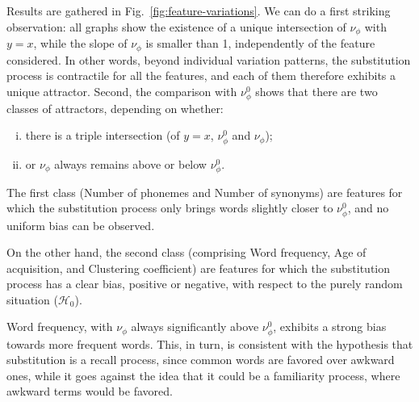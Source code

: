 \medskip
Results are gathered in Fig.~\ref{fig:feature-variations}.
We can do a first striking observation: all graphs show the existence of a unique intersection of $\nu_{\phi}$ with $y=x$, while the slope of $\nu_{\phi}$ is smaller than 1, independently of the feature considered.
In other words, beyond individual variation patterns, the substitution process is contractile for all the features, and each of them therefore exhibits a unique attractor.
Second, the comparison with $\nu_{\phi}^0$ shows that there are two classes of attractors, depending on whether:
\begin{enumerate}[(i)] 
\item there is a triple intersection (of $y=x$, $\nu_{\phi}^0$ and $\nu_{\phi}$);
\item or $\nu_{\phi}$ always remains above or below $\nu_{\phi}^0$.
\end{enumerate}
The first class (Number of phonemes and Number of synonyms) are features for which the substitution process only brings words slightly closer to $\nu_{\phi}^0$, and no uniform bias can be observed.


On the other hand, the second class (comprising Word frequency, Age of acquisition, and Clustering coefficient) are features for which the substitution process has a clear bias, positive or negative, with respect to the purely random situation ($\mathcal{H}_0$).

Word frequency, with $\nu_{\phi}$ always significantly above $\nu_{\phi}^0$, exhibits a strong bias towards more frequent words. This, in turn, is consistent with the hypothesis that substitution is a recall process, since common words are favored over awkward ones, while it goes against the idea that it could be a familiarity process, where awkward terms would be favored.


